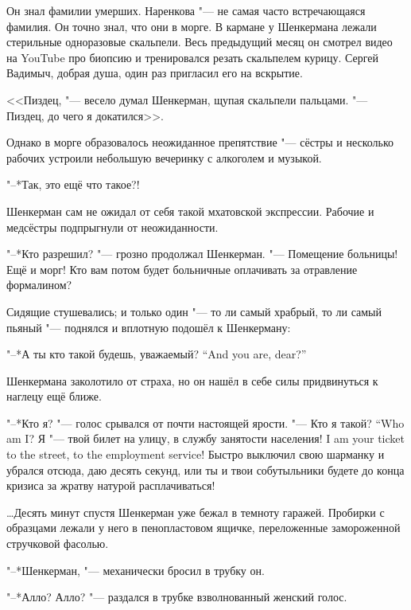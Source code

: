 Он знал фамилии умерших.
Наренкова "--- не самая часто встречающаяся фамилия.
Он точно знал, что они в морге.
В кармане у Шенкермана лежали стерильные одноразовые скальпели.
Весь предыдущий месяц он смотрел видео на YouTube про биопсию и тренировался резать скальпелем курицу.
Сергей Вадимыч, добрая душа, один раз пригласил его на вскрытие.

<<Пиздец, "--- весело думал Шенкерман, щупая скальпели пальцами.
"--- Пиздец, до чего я докатился>>.

\textspace

Однако в морге образовалось неожиданное препятствие "--- сёстры и несколько рабочих устроили небольшую вечеринку с алкоголем и музыкой.

"--*Так, это ещё что такое?!

Шенкерман сам не ожидал от себя такой мхатовской экспрессии.
Рабочие и медсёстры подпрыгнули от неожиданности.

"--*Кто разрешил? "--- грозно продолжал Шенкерман.
"--- Помещение больницы!
Ещё и морг!
Кто вам потом будет больничные оплачивать за отравление формалином?

Сидящие стушевались;
и только один "--- то ли самый храбрый, то ли самый пьяный "--- поднялся и вплотную подошёл к Шенкерману:

{"--*А ты кто такой будешь, уважаемый?}
{``And you are, dear?''}

Шенкермана заколотило от страха, но он нашёл в себе силы придвинуться к наглецу ещё ближе.

"--*Кто я? "--- голос срывался от почти настоящей ярости.
{"--- Кто я такой?}
{``Who am I?}
{Я "--- твой билет на улицу, в службу занятости населения!}
{I am your ticket to the street, to the employment service!}
Быстро выключил свою шарманку и убрался отсюда, даю десять секунд, или ты и твои собутыльники будете до конца кризиса за жратву натурой расплачиваться!

\ldots{}Десять минут спустя Шенкерман уже бежал в темноту гаражей.
Пробирки с образцами лежали у него в пенопластовом ящичке, переложенные замороженной стручковой фасолью.

\asterism

\textspace

\label{Wed_2012_08_29}

"--*Шенкерман, "--- механически бросил в трубку он.

"--*Алло? Алло? "--- раздался в трубке взволнованный женский голос.

